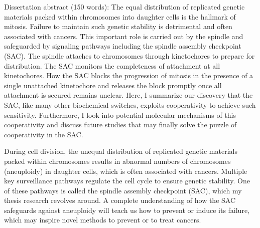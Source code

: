 Dissertation abstract (150 words): The equal distribution of replicated genetic materials packed within chromosomes into daughter cells is the hallmark of mitosis. Failure to maintain such genetic stability is detrimental and often associated with cancers. This important role is carried out by the spindle and safeguarded by signaling pathways including the spindle assembly checkpoint (SAC). The spindle attaches to chromosomes through kinetochores to prepare for distribution. The SAC monitors the completeness of attachment at all kinetochores. How the SAC blocks the progression of mitosis in the presence of a single unattached kinetochore and releases the block promptly once all attachment is secured remains unclear. Here, I summarize our discovery that the SAC, like many other biochemical switches, exploits cooperativity to achieve such sensitivity. Furthermore, I look into potential molecular mechanisms of this cooperativity and discuss future studies that may finally solve the puzzle of cooperativity in the SAC.

During cell division, the unequal distribution of replicated genetic materials packed within chromosomes results in abnormal numbers of chromosomes (aneuploidy) in daughter cells, which is often associated with cancers. Multiple key surveillance pathways regulate the cell cycle to ensure genetic stability. One of these pathways is called the spindle assembly checkpoint (SAC), which my thesis research revolves around. A complete understanding of how the SAC safeguards against aneuploidy will teach us how to prevent or induce its failure, which may inspire novel methods to prevent or to treat cancers.

